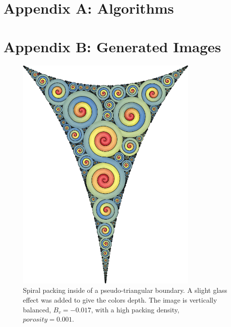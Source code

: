 \documentclass[11pt]{IEEEtran}
\begin{document}

{}


\clearpage
\onecolumn

\section*{Appendix A: Algorithms} 
\label{app:A}


\clearpage
\section*{Appendix B: Generated Images} 
\label{app:B}

\begin{figure}[H]
\centering \includegraphics[width=0.8\textwidth]{pseudo-triangle}
\caption{Spiral packing inside of a pseudo-triangular boundary. A slight glass effect was added to give the colors depth. The image is vertically balanced, $B_{v} = -0.017$, with a high packing density, $porosity = 0.001$.}
\end{figure}
\end{document}
